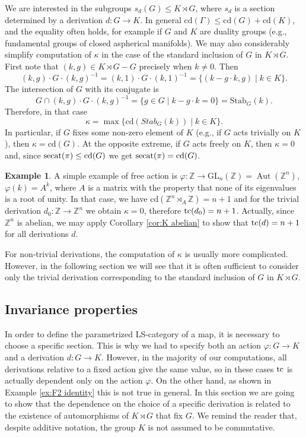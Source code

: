 \documentclass[11pt]{amsart}
\theoremstyle{plain}
\theoremstyle{definition}
\newtheorem{example}[theorem]{Example}
\newcommand{\ZZ}{{\mathbb{Z}}}
\newcommand{\secat}{\mathop{\rm secat}\nolimits}
\newcommand{\tc}{\mathop{\rm tc}\nolimits}
\newcommand{\cd}{\mathrm{cd}}
\DeclareMathOperator{\Aut}{Aut}
\begin{document}
We are interested in the subgroups $s_d(G)\le  K\rtimes G$, where $s_d$ is a section determined by
a derivation $d\colon G\to K$. In general $\cd(\Gamma)\le\cd(G)+\cd(K)$, and the equality often holds, 
for example if $G$ and $K$ are duality groups (e.g., fundamental groups of closed aspherical manifolds).
We may also considerably simplify computation of $\kappa$ in the case of the standard 
inclusion of $G$ in $K\rtimes G$. First note
that $(k,g)\in K\rtimes G-G$ precisely when $k\ne 0$. Then
$$(k,g)\cdot G\cdot (k,g)^{-1}=(k,1)\cdot G\cdot (k,1)^{-1}=\{(k-g\cdot k,g)\mid k\in K\}.$$
The intersection of $G$ with its conjugate is 
$$G\cap (k,g)\cdot G\cdot (k,g)^{-1}=\{g\in G\mid k-g\cdot k=0\}=\mathrm{Stab}_G(k).$$
Therefore, in that case 
$$\kappa=\max\{\cd(Stab_G(k))\mid k\in K\}.$$ 
In particular, if $G$ fixes some non-zero element of $K$ (e.g., if $G$ acts trivially on $K$),
then $\kappa=\cd(G)$. At the opposite extreme, if $G$ acts freely on $K$, then $\kappa=0$ and,
since $\secat(\pi)\le\cd(G)$ we get $\secat(\pi)=\cd(G)$. 

\begin{example}
A simple example of free action is $\varphi\colon\ZZ\to \mathrm{GL}_n(\ZZ)=\Aut(\ZZ^n)$, $\varphi(k)=A^k$, 
where $A$ is a matrix with the property that none of its eigenvalues is a root of unity. 
In that case, we have $\cd(\ZZ^n\rtimes_A\ZZ)=n+1$ and for the trivial derivation 
$d_0\colon\ZZ\to\ZZ^n$ we obtain $\kappa=0$, therefore $\tc(d_0)=n+1$. Actually, since 
$\ZZ^n$ is abelian, we may apply Corollary \ref{cor:K abelian} to show that 
$\tc(d)=n+1$ for all derivations $d$.
\end{example}

For non-trivial derivations, the computation of $\kappa$ is usually more complicated. 
However, in the following section we will see 
that it is often sufficient to consider only the trivial derivation corresponding to the 
standard inclusion of $G$ in $K\rtimes G$.



\subsection{Invariance properties} In order to define the parametrized LS-category of a map,
it is necessary to choose a specific section. This is why we had to specify both an action 
$\varphi\colon G\to K$ and a derivation $d\colon G\to K$. However, in the majority of our computations, 
all derivations relative to a fixed action give the same value, so in these cases $\tc$ is 
actually dependent
only on the action $\varphi$. On the other hand, as shown in Example \ref{ex:F2 identity} this is not
true in general. In this section we are going to show that the dependence on the choice 
of a specific derivation is related to the existence of automorphisms of $K\rtimes G$ that fix $G$. 
We remind the reader that, despite additive notation, the group $K$ is not assumed to
be commutative. 
\end{document}
